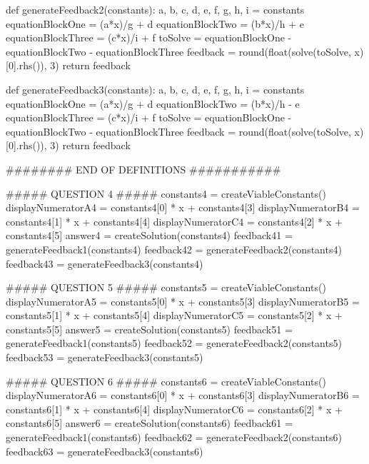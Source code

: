 \documentclass{ximera}
\begin{document}
\begin{sagesilent}
def generateFeedback2(constants):
    a, b, c, d, e, f, g, h, i = constants
    equationBlockOne = (a*x)/g + d
    equationBlockTwo = (b*x)/h + e
    equationBlockThree = (c*x)/i + f
    toSolve = equationBlockOne - equationBlockTwo - equationBlockThree
    feedback = round(float(solve(toSolve, x)[0].rhs()), 3)
    return feedback

def generateFeedback3(constants): 
    a, b, c, d, e, f, g, h, i = constants
    equationBlockOne = (a*x)/g + d
    equationBlockTwo = (b*x)/h - e
    equationBlockThree = (c*x)/i + f
    toSolve = equationBlockOne - equationBlockTwo - equationBlockThree
    feedback = round(float(solve(toSolve, x)[0].rhs()), 3)
    return feedback


######## END OF DEFINITIONS ###########

##### QUESTION 4 #####
constants4 = createViableConstants()
displayNumeratorA4 = constants4[0] * x + constants4[3]
displayNumeratorB4 = constants4[1] * x + constants4[4]
displayNumeratorC4 = constants4[2] * x + constants4[5]
answer4 = createSolution(constants4)
feedback41 = generateFeedback1(constants4)
feedback42 = generateFeedback2(constants4)
feedback43 = generateFeedback3(constants4)

##### QUESTION 5 #####
constants5 = createViableConstants()
displayNumeratorA5 = constants5[0] * x + constants5[3]
displayNumeratorB5 = constants5[1] * x + constants5[4]
displayNumeratorC5 = constants5[2] * x + constants5[5]
answer5 = createSolution(constants5)
feedback51 = generateFeedback1(constants5)
feedback52 = generateFeedback2(constants5)
feedback53 = generateFeedback3(constants5)

##### QUESTION 6 #####
constants6 = createViableConstants()
displayNumeratorA6 = constants6[0] * x + constants6[3]
displayNumeratorB6 = constants6[1] * x + constants6[4]
displayNumeratorC6 = constants6[2] * x + constants6[5]
answer6 = createSolution(constants6)
feedback61 = generateFeedback1(constants6)
feedback62 = generateFeedback2(constants6)
feedback63 = generateFeedback3(constants6)
\end{sagesilent}
\end{document}
